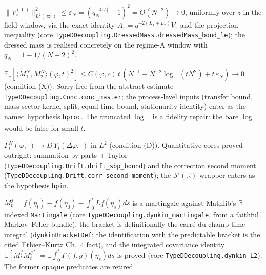 \begin{lemma}\label{lem:eps}
  \leanok
  $\|V_z^{(\mathrm{dr})}\|^2_{L^2(\varpi)} \le \varepsilon_N =
  (q_N^{-4|\Lambda|}-1)^2 = O(N^{-2}) \to 0$, uniformly over $z$ in the field window,
  via the exact identity $A_z = q^{-2(L_1+L_2)}V_z$ and the projection inequality
  (core \texttt{TypeDDecoupling.DressedMass.dressedMass\_bond\_le}); the dressed mass
  is realised concretely on the regime-A window with $q_N = 1-1/(N+2)^2$.
\end{lemma}

\begin{proposition}\label{prop:conc}
  \leanok
  $\mathbb E_\nu[\langle M_1^N,M_2^N\rangle(\varphi,t)^2] \le
  C(\varphi,c)\,t\,(N^{-1} + N^{-2}\log_+(tN^2) + t\,\varepsilon_N) \to 0$
  (condition (X)).  Sorry-free from the abstract estimate
  \texttt{TypeDDecoupling.Conc.conc\_master}; the process-level inputs (transfer bound,
  mass-sector kernel split, equal-time bound, stationarity identity) enter as the
  named hypothesis \texttt{hproc}.  The truncated $\log_+$ is a fidelity repair: the
  bare $\log$ would be false for small $t$.
\end{proposition}

\begin{proposition}\label{prop:drift}
  \leanok
  $\Gamma_i^N(\varphi,\cdot) \to D\,Y_i(\Delta\varphi,\cdot)$ in $L^2$ (condition (D)).
  Quantitative cores proved outright: summation-by-parts + Taylor
  (\texttt{TypeDDecoupling.Drift.drift\_sbp\_bound}) and the correction second moment
  (\texttt{TypeDDecoupling.Drift.corr\_second\_moment}); the $\mathcal S'(\mathbb R)$
  wrapper enters as the hypothesis \texttt{hpin}.
\end{proposition}

\begin{lemma}\label{lem:dynkin}
  \leanok
  $M^f_t = f(\eta_t)-f(\eta_0)-\int_0^t Lf(\eta_s)ds$ is a martingale against
  Mathlib's $\mathbb R$-indexed \texttt{Martingale} (core
  \texttt{TypeDDecoupling.dynkin\_martingale}, from a faithful Markov--Feller bundle),
  the bracket is definitionally the carr\'e-du-champ time integral
  (\texttt{dynkinBracketDef}; the identification with the predictable bracket is the
  cited Ethier--Kurtz Ch.~4 fact), and the integrated covariance identity
  $\mathbb E[M^f_tM^g_t] = \mathbb E\int_0^t \Gamma(f,g)(\eta_s)ds$ is proved
  (core \texttt{TypeDDecoupling.dynkin\_L2}).  The former opaque predicates are retired.
\end{lemma}

